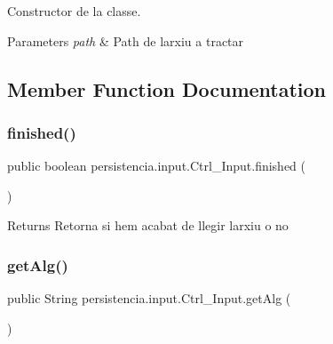 Constructor de la classe. 


\begin{DoxyParams}{Parameters}
{\em path} & Path de l\textquotesingle{}arxiu a tractar \\
\hline
\end{DoxyParams}


\subsection{Member Function Documentation}
\mbox{\label{classpersistencia_1_1input_1_1Ctrl__Input_a5a94d207dce0fd592b5ac17f55154d4f}} 
\subsubsection{\texorpdfstring{finished()}{finished()}}
{\footnotesize\ttfamily public boolean persistencia.\+input.\+Ctrl\+\_\+\+Input.\+finished (\begin{DoxyParamCaption}{ }\end{DoxyParamCaption})\hspace{0.3cm}{\ttfamily [inline]}}

\begin{DoxyReturn}{Returns}
Retorna si hem acabat de llegir l\textquotesingle{}arxiu o no 
\end{DoxyReturn}
\mbox{\label{classpersistencia_1_1input_1_1Ctrl__Input_aa69f79fb581f6d80c5a9609148794570}} 
\subsubsection{\texorpdfstring{get\+Alg()}{getAlg()}}
{\footnotesize\ttfamily public String persistencia.\+input.\+Ctrl\+\_\+\+Input.\+get\+Alg (\begin{DoxyParamCaption}{ }\end{DoxyParamCaption})\hspace{0.3cm}{\ttfamily [inline]}}

